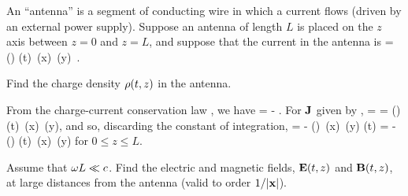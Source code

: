 \begin{statement}{}
	An ``antenna'' is a segment of conducting wire in which a current flows (driven by an external power supply).  Suppose an antenna of length $L$ is placed on the $z$ axis between $z = 0$ and $z = L$, and suppose that the current in the antenna is
	\beqn \label{J3}
		\vJ\tz = \Io \sin() \cos(\omg t) \,\del(x) \,\del(y) \,\zh.
	\eeqn
	\vfix
\end{statement}

\begin{problem}
	Find the charge density $\rho(t, z)$ in the antenna.
\end{problem}

\begin{solution}
	From the charge-current conservation law , we have
	\beq
		\rho\tz = -\int \div{\vJ} \dt.
	\eeq
	For $\vb{J}$ given by ,
	\beq
		\div{\vJ} = 
		=  \Io \cos() \cos(\omg t) \,\del(x) \,\del(y),
	\eeq
	and so, discarding the constant of integration,
	\beq
		\rho\tz = - \Io \cos() \,\del(x) \,\del(y) \int \cos(\omg t) \dt
		= - \frac{\Io}{\omg} \cos() \sin(\omg t) \,\del(x) \,\del(y)
	\eeq
	for $0 \leq z \leq L$.
\end{solution}



\begin{problem}
	Assume that $\omega L \ll c$.  Find the electric and magnetic fields, $\vb{E}(t, z)$ and $\vb{B}(t, z)$, at large distances from the antenna (valid to order $1 / \abs{\vb{x}}$).
\end{problem}


